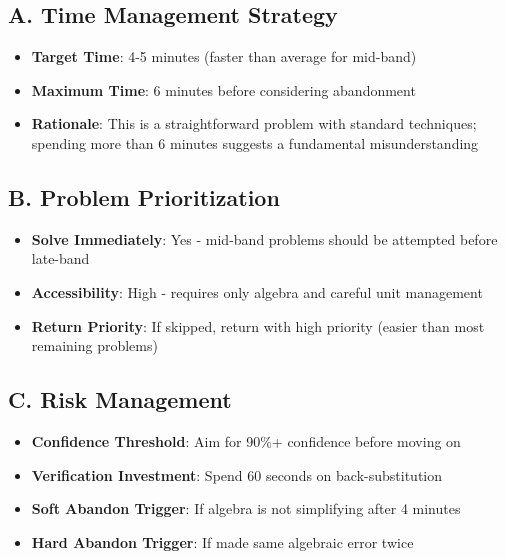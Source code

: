 \documentclass[11pt]{article}
\begin{document}
\begin{competitionbox}
\subsection*{A. Time Management Strategy}
\begin{itemize}[leftmargin=*]
    \item \textbf{Target Time}: 4-5 minutes (faster than average for mid-band)
    \item \textbf{Maximum Time}: 6 minutes before considering abandonment
    \item \textbf{Rationale}: This is a straightforward problem with standard techniques; spending more than 6 minutes suggests a fundamental misunderstanding
\end{itemize}

\subsection*{B. Problem Prioritization}
\begin{itemize}[leftmargin=*]
    \item \textbf{Solve Immediately}: Yes - mid-band problems should be attempted before late-band
    \item \textbf{Accessibility}: High - requires only algebra and careful unit management
    \item \textbf{Return Priority}: If skipped, return with high priority (easier than most remaining problems)
\end{itemize}

\subsection*{C. Risk Management}
\begin{itemize}[leftmargin=*]
    \item \textbf{Confidence Threshold}: Aim for 90\%+ confidence before moving on
    \item \textbf{Verification Investment}: Spend 60 seconds on back-substitution
    \item \textbf{Soft Abandon Trigger}: If algebra is not simplifying after 4 minutes
    \item \textbf{Hard Abandon Trigger}: If made same algebraic error twice
\end{itemize}


\end{competitionbox}
\end{document}
